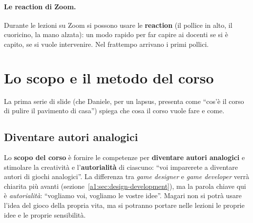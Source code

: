 \paragraph{Le reaction di Zoom.} Durante le lezioni su Zoom si possono usare le
\textbf{reaction} (il pollice in alto, il cuoricino, la mano alzata): un modo
rapido per far capire ai docenti se si è capito, se si vuole intervenire. Nel
frattempo arrivano i primi pollici.

\section{Lo scopo e il metodo del corso}
\label{a1:sec:scopo}

La prima serie di slide (che Daniele, per un lapsus, presenta come ``cos'è il
corso di pulire il pavimento di casa'') spiega che cosa il corso vuole fare e
come.

\subsection{Diventare autori analogici}

Lo \textbf{scopo del corso} è fornire le competenze per \textbf{diventare autori
analogici} e stimolare la creatività e l'\textbf{autorialità} di ciascuno: ``voi
imparerete a diventare autori di giochi analogici''. La differenza tra
\emph{game designer} e \emph{game developer} verrà chiarita più avanti (sezione~\ref{a1:sec:design-development}),
ma la parola chiave qui è \emph{autorialità}: ``vogliamo voi, vogliamo le vostre
idee''. Magari non si potrà usare l'idea del gioco della propria vita, ma si
potranno portare nelle lezioni le proprie idee e le proprie sensibilità.


